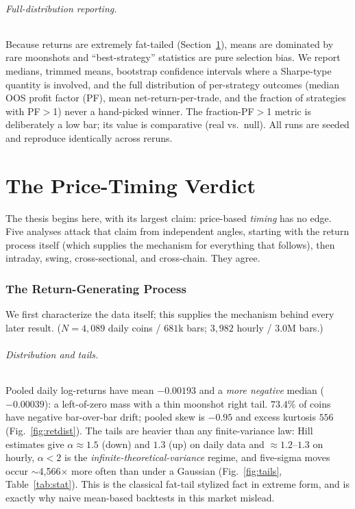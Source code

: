\documentclass[12pt]{article}
\begin{document}
\paragraph{Full-distribution reporting.} Because returns are extremely fat-tailed (Section~\ref{sec:stat}), means are dominated by rare moonshots and ``best-strategy'' statistics are pure selection bias. We report medians, trimmed means, bootstrap confidence intervals where a Sharpe-type quantity is involved, and the full distribution of per-strategy outcomes (median OOS profit factor (PF), mean net-return-per-trade, and the fraction of strategies with PF$>$1) never a hand-picked winner. The fraction-PF$>$1 metric is deliberately a low bar; its value is comparative (real vs.\ null). All runs are seeded and reproduce identically across reruns.

\part{The Price-Timing Verdict}\label{part:timing}

\noindent The thesis begins here, with its largest claim: price-based \emph{timing} has no edge. Five analyses attack that claim from independent angles, starting with the return process itself (which supplies the mechanism for everything that follows), then intraday, swing, cross-sectional, and cross-chain. They agree.

\section{The Return-Generating Process}\label{sec:stat}
We first characterize the data itself; this supplies the mechanism behind every later result. ($N=4{,}089$ daily coins / $681$k bars; $3{,}982$ hourly / $3.0$M bars.)

\paragraph{Distribution and tails.} Pooled daily log-returns have mean $-0.00193$ and a \emph{more negative} median ($-0.00039$): a left-of-zero mass with a thin moonshot right tail. $73.4\%$ of coins have negative bar-over-bar drift; pooled skew is $-0.95$ and excess kurtosis $556$ (Fig.~\ref{fig:retdist}). The tails are heavier than any finite-variance law: Hill estimates give $\alpha\approx1.5$ (down) and $1.3$ (up) on daily data and $\approx1.2$--$1.3$ on hourly, $\alpha<2$ is the \emph{infinite-theoretical-variance} regime, and five-sigma moves occur $\sim$4{,}566$\times$ more often than under a Gaussian (Fig.~\ref{fig:tails}, Table~\ref{tab:stat}). This is the classical fat-tail stylized fact \cite{mandelbrot1963,cont2001} in extreme form, and is exactly why naive mean-based backtests in this market mislead.
\end{document}
